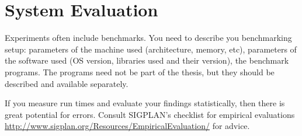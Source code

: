 \chapter{System Evaluation}\label{chap:evaluation}

Experiments often include benchmarks.
You need to describe you benchmarking setup: parameters of the machine used (architecture, memory, etc), parameters of the software used (OS version, libraries used and their version), the benchmark programs.
The programs need not be part of the thesis, but they should be described and available separately.

If you measure run times and evaluate your findings statistically, then there is great potential for errors.
Consult SIGPLAN's checklist for empirical evaluations \url{http://www.sigplan.org/Resources/EmpiricalEvaluation/} for advice. 


